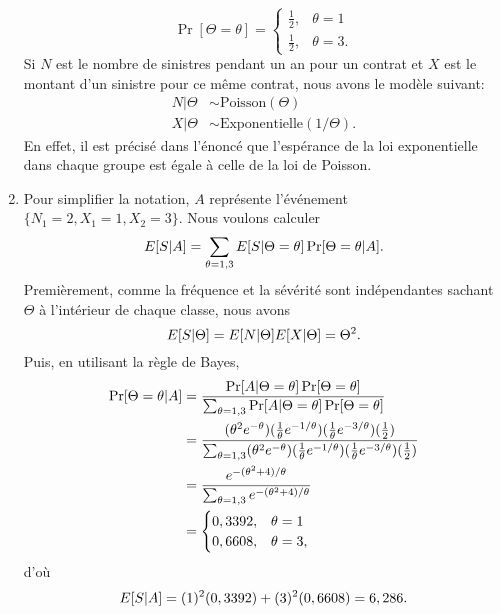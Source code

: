 \begin{exercice}
\begin{sol}
\begin{enumerate}
      \begin{equation*}
        \Pr[\Theta = \theta] =
        \begin{cases}
          \frac{1}{2}, & \theta = 1 \\
          \frac{1}{2}, & \theta = 3.
        \end{cases}
      \end{equation*}
      Si $N$ est le nombre de sinistres pendant un an pour un contrat
      et $X$ est le montant d'un sinistre pour ce même contrat, nous avons
      le modèle suivant:
      \begin{align*}
        N|\Theta
        &\sim \text{Poisson}(\Theta) \\
        X|\Theta &\sim \text{Exponentielle}(1/\Theta).
      \end{align*}
      En effet, il est précisé dans l'énoncé que l'espérance de la loi
      exponentielle dans chaque groupe est égale à celle de la loi de
      Poisson.
    \item Pour simplifier la notation, $A$ représente l'événement
      $\{N_1=2, X_1=1, X_2=3\}$. Nous voulons calculer
      \begin{equation*}
        E [ S|A ] =
        \sum_{\theta=1,3} E [ S|\Theta = \theta ]
        \Pr[\Theta = \theta|A].
      \end{equation*}
      Premièrement, comme la fréquence et la sévérité sont
      indépendantes sachant $\Theta$ à l'intérieur de chaque classe,
      nous avons
      \begin{equation*}
        E [ S|\Theta ] = E [ N|\Theta ] E [ X|\Theta ] = \Theta^2.
      \end{equation*}
      Puis, en utilisant la règle de Bayes,
      \begin{align*}
        \Pr[\Theta=\theta|A]
        &= \frac{\Pr[A|\Theta=\theta] \Pr[\Theta=\theta]}{%
          \sum_{\theta=1,3} \Pr[A|\Theta=\theta] \Pr[\Theta=\theta]} \\
        &= \frac{(\theta^2 e^{-\theta})
          (\frac{1}{\theta} e^{-1/\theta})
          (\frac{1}{\theta} e^{-3/\theta})
          (\frac{1}{2})}{%
          \sum_{\theta=1,3} (\theta^2 e^{-\theta})
          (\frac{1}{\theta} e^{-1/\theta})
          (\frac{1}{\theta} e^{-3/\theta})
          (\frac{1}{2})} \\
        &= \frac{e^{-(\theta^2+4)/\theta}}
        {\sum_{\theta=1,3} e^{-(\theta^2+4)/\theta}} \\
        &=
        \begin{cases}
          0,3392, & \theta = 1 \\
          0,6608, & \theta = 3,
        \end{cases}
      \end{align*}
      d'où
      \begin{equation*}
        E [ S|A ] = (1)^2 (0,3392) + (3)^2 (0,6608) = 6,286.
      \end{equation*}
    \end{enumerate}
  \end{sol}
\end{exercice}


